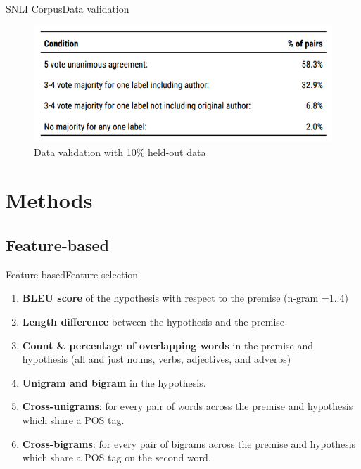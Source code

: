 \documentclass{beamer}
\begin{document}
\begin{frame}{SNLI Corpus}{Data validation}
  \begin{figure}[h]
    \centering
    \includegraphics[scale=0.5]{data_validation}
    \caption{Data validation with 10\% held-out data\footnotemark}
  \end{figure}
\end{frame}


\section{Methods}

\subsection{Feature-based}

\begin{frame}{Feature-based}{Feature selection}
  \begin{enumerate}
      \item \textbf{BLEU score} of the hypothesis with respect to the premise (n-gram =1..4)
      \item \textbf{Length difference} between the hypothesis and the premise
      \item \textbf{Count \& percentage of  overlapping words}  in  the  premise and hypothesis (all and just nouns, verbs, adjectives, and adverbs)
      \item \textbf{Unigram and bigram} in the hypothesis.
      \item \textbf{Cross-unigrams}: for  every  pair  of  words across  the  premise  and  hypothesis  which share a POS tag.
      \item \textbf{Cross-bigrams}: for  every  pair  of  bigrams across  the  premise  and  hypothesis  which share a POS tag on the second word.
  \end{enumerate}
\end{frame}
\end{document}
